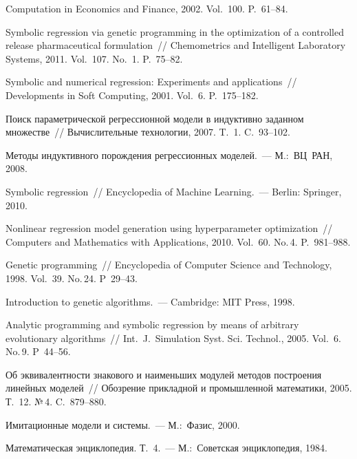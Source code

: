 \begin{multicols}{2}
{{\begin{thebibliography}{99}
\noindent
 Computation in Economics and Finance, 2002. 
Vol.~100.  P.~61--84.

Symbolic regression via genetic programming in the optimization of 
a controlled release pharmaceutical formulation~// Chemometrics and 
Intelligent Laboratory Systems, 2011. Vol.~107. No.~1. P.~75--82.

 Symbolic and numerical 
regression: Experiments and applications~// Developments in Soft Computing, 2001. 
Vol.~6. P.~175--182.

Поиск параметрической регрессионной модели в индуктивно заданном множестве~// 
Вычислительные технологии, 2007. T.~1. C.~93--102.

 Методы индуктивного порождения регрессионных моделей.~--- М.:~ВЦ~РАН, 2008.


 Symbolic regression~// Encyclopedia of Machine Learning.~---  
Berlin: Springer, 2010.


 Nonlinear regression model generation using 
hyperparameter optimization~// Computers and Mathematics with Applications, 2010. Vol.~60. No.\,4. P.~981--988.

Genetic programming~// Encyclopedia of Computer Science and Technology, 1998. Vol.~39. No.\,24. P~29--43.

 Introduction to genetic algorithms.~--- Cambridge: MIT Press, 1998.

 Analytic programming and symbolic 
regression by means of arbitrary evolutionary algorithms~// Int.\ 
J.~Simulation Syst. Sci. Technol., 2005. Vol.~6. No.\,9. P~44--56.

Об эквивалентности знакового и наименьших модулей методов построения линейных моделей~// 
Обозрение прикладной и промышленной математики, 2005. Т.~12. №\,4. C.~879--880.

  Имитационные 
модели и системы.~--- М.:~Фазис, 2000.

  
Математическая энциклопедия. Т.~4.~--- М.:~Советская энциклопедия, 1984.


\end{thebibliography}}}
\end{multicols}
